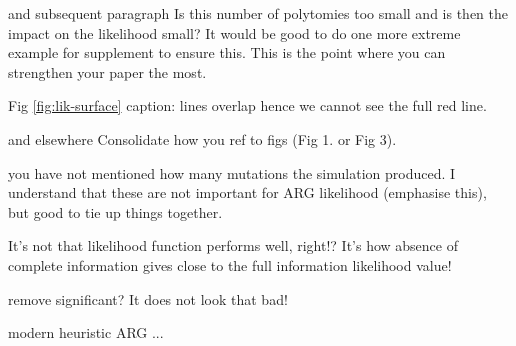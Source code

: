 \reply{
}

\begin{point}{\revref{} and subsequent paragraph} %
 Is this number of polytomies too small and is then the impact on the likelihood small? It would be good to do one more extreme example for supplement to ensure this. This is the point where you can strengthen your paper the most.
\end{point}

\reply{
}

\begin{point}{Fig \ref{fig:lik-surface} caption:}
 lines overlap hence we cannot see the full red line.
\end{point}

\reply{
}

\begin{point}{\revref{} and elsewhere} %
 Consolidate how you ref to figs (Fig 1. or Fig 3).
\end{point}

\reply{
}

\begin{point}{\revref} %
 you have not mentioned how many mutations the simulation produced. I understand that these are not important for ARG likelihood (emphasise this), but good to tie up things together.
\end{point}

\reply{
}

\begin{point}{\revref} %
 It's not that likelihood function performs well, right!? It's how absence of complete information gives close to the full information likelihood value!
\end{point}

\reply{
}

\begin{point}{\revref} %
 remove significant? It does not look that bad!
\end{point}

\reply{
}


\begin{point}{\revref} %
 modern heuristic ARG ...
\end{point}


